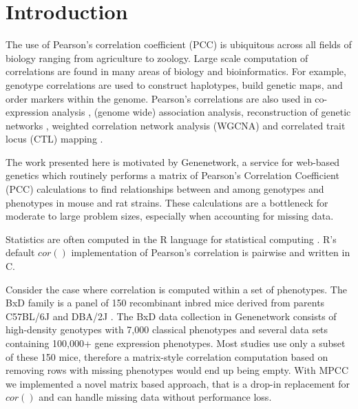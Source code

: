 \documentclass{bioinfo}
\begin{document}
\maketitle


\section{Introduction}

The use of Pearson's correlation coefficient (PCC) is ubiquitous
across all fields of biology ranging from agriculture to
zoology. Large scale computation of correlations are found in many
areas of biology and bioinformatics.  For example, genotype
correlations are used to construct haplotypes, build genetic maps, and
order markers within the genome. Pearson's correlations are also used
in co-expression analysis \citep{Tesson:2010}, (genome wide)
association analysis, reconstruction of genetic
networks \citep{Fukushima:2013}, weighted correlation network analysis
(WGCNA) \citep{Horvath:2008} and correlated trait locus (CTL)
mapping \citep{Arends2016a}.



\enlargethispage{12pt}

The work presented here is motivated by Genenetwork, a service for
web-based genetics \citep{Sloan2016} which routinely performs a matrix
of Pearson's Correlation Coefficient (PCC) calculations to find
relationships between and among genotypes and phenotypes in mouse and
rat strains. These calculations are a bottleneck for moderate to large
problem sizes, especially when accounting for missing data.

Statistics are often computed in the R language for statistical
computing \citep{R:2005}. R's default $cor()$ implementation of
Pearson's correlation is pairwise and written in C.

Consider the case where correlation is computed within a set of
phenotypes. The BxD family is a panel of 150 recombinant inbred mice
derived from parents C57BL/6J and DBA/2J \citep{Ashbrook:2019}. The
BxD data collection in Genenetwork consists of high-density genotypes
with 7,000 classical phenotypes and several data sets containing 100,000+ gene
expression phenotypes.  Most studies use only a subset of these 150 mice,
therefore a matrix-style correlation computation based on removing
rows with missing phenotypes would end up being empty.  With MPCC we
implemented a novel matrix based approach, that is a drop-in
replacement for $cor()$ and can handle missing data without
performance loss.
\end{document}
